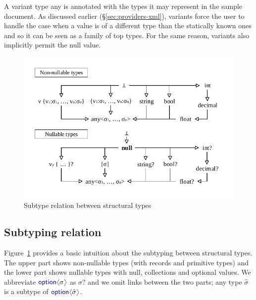 \documentclass[10pt,preprint,blind,clearpagebib]{sigplanconf}
\newcommand{\langl}{\begin{picture}(4.5,7)
\put(1.1,2.5){\rotatebox{60}{\line(1,0){5.5}}}
\put(1.1,2.5){\rotatebox{300}{\line(1,0){5.5}}}
\end{picture}}
\newcommand{\rangl}{\begin{picture}(4.5,7)
\put(.9,2.5){\rotatebox{120}{\line(1,0){5.5}}}
\put(.9,2.5){\rotatebox{240}{\line(1,0){5.5}}}
\end{picture}}
\newcommand{\kvd}[1]{\textnormal{\textcolor{kvdclr}{\sffamily #1}}}
\begin{document}
A variant type \kvd{any} is annotated with the types it may represent in the sample document.
As discussed earlier (\S\ref{sec:providers-xml}), variants force the user to handle the case when 
a value is of a different type than the statically known ones and so it can be seen as a family of 
top types. For the same reason, variants also implicitly permit the \kvd{null} value. 


\begin{figure}
\begin{center}
\includegraphics[scale=0.80,trim=5mm 5mm 5mm 5mm,clip]{images/hierarchy.pdf} %
\end{center}
\vspace{-0.5em}
\caption{Subtype relation between structural types}
\label{fig:subtyping-diagram}
\vspace{-0.5em}
\end{figure}


\subsection{Subtyping relation}
\label{sec:inference-subtyping}

Figure~\ref{fig:subtyping-diagram} provides a basic intuition about the subtyping between
structural types. The upper part shows non-nullable types (with records and primitive types) and 
the lower part shows nullable types with \kvd{null}, collections and optional values. We 
abbreviate $\kvd{option}\langl\sigma\rangl$ as $\sigma?$ and we omit links between the two parts;
any type $\hat{\sigma}$ is a subtype of $\kvd{option}\langl\hat{\sigma}\rangl$.
\end{document}
